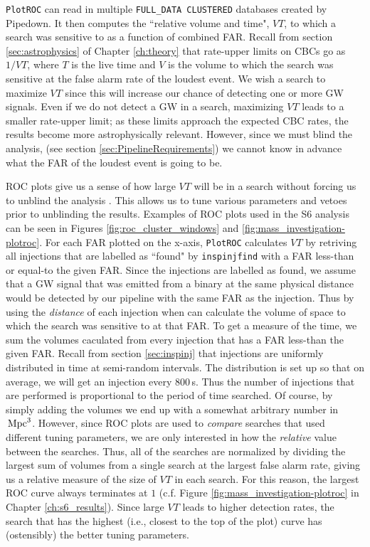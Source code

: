 \texttt{PlotROC} can read in multiple \verb|FULL_DATA CLUSTERED| databases
created by Pipedown. It then computes the ``relative volume and time", $VT$, to
which a search was sensitive to as a function of combined \ac{FAR}. Recall from
section \ref{sec:astrophysics} of Chapter \ref{ch:theory} that rate-upper
limits on \acp{CBC} go as $1/VT$, where $T$ is the live time and $V$ is the
volume to which the search was sensitive at the false alarm rate of the loudest
event. We wish a search to maximize $VT$ since this will increase our chance of
detecting one or more \ac{GW} signals. Even if we do not detect a \ac{GW} in a
search, maximizing $VT$ leads to a smaller rate-upper limit; as these limits
approach the expected \ac{CBC} rates, the results become more astrophysically
relevant.  However, since we must blind the analysis, (see section
\ref{sec:PipelineRequirements}) we cannot know in advance what the \ac{FAR} of
the loudest event is going to be.

ROC plots give us a sense of how large $VT$ will be in a search without forcing
us to unblind the analysis \cite{Keppel:personal-comm}. This allows us to tune
various parameters and vetoes prior to unblinding the results. Examples of ROC
plots used in the \ac{S6} analysis can be seen in Figures
\ref{fig:roc_cluster_windows} and \ref{fig:mass_investigation-plotroc}. For
each \ac{FAR} plotted on the x-axis, \texttt{PlotROC} calculates $VT$ by
retriving all injections that are labelled as ``found" by \verb|inspinjfind|
with a \ac{FAR} less-than or equal-to the given \ac{FAR}. Since the injections
are labelled as found, we assume that a \ac{GW} signal that was emitted from a
binary at the same physical distance would be detected by our pipeline with the
same \ac{FAR} as the injection. Thus by using the \emph{distance} of each
injection when can calculate the volume of space to which the search was
sensitive to at that \ac{FAR}. To get a measure of the time, we sum the volumes
caculated from every injection that has a \ac{FAR} less-than the given
\ac{FAR}. Recall from section \ref{sec:inspinj} that injections are uniformly
distributed in time at semi-random intervals. The distribution is set up so
that on average, we will get an injection every $800\,$s. Thus the number of
injections that are performed is proportional to the period of time searched.
Of course, by simply adding the volumes we end up with a somewhat arbitrary
number in $\,\mathrm{Mpc}^3$. However, since ROC plots are used to \emph{compare}
searches that used different tuning parameters, we are only interested in how
the \emph{relative} value between the searches. Thus, all of the searches are
normalized by dividing the largest sum of volumes from a single search at the
largest false alarm rate, giving us a relative measure of the size of $VT$ in
each search. For this reason, the largest ROC curve always terminates at $1$
(c.f. Figure \ref{fig:mass_investigation-plotroc} in Chapter
\ref{ch:s6_results}). Since large $VT$ leads to higher detection rates, the
search that has the highest (i.e., closest to the top of the plot) curve has
(ostensibly) the better tuning parameters.

